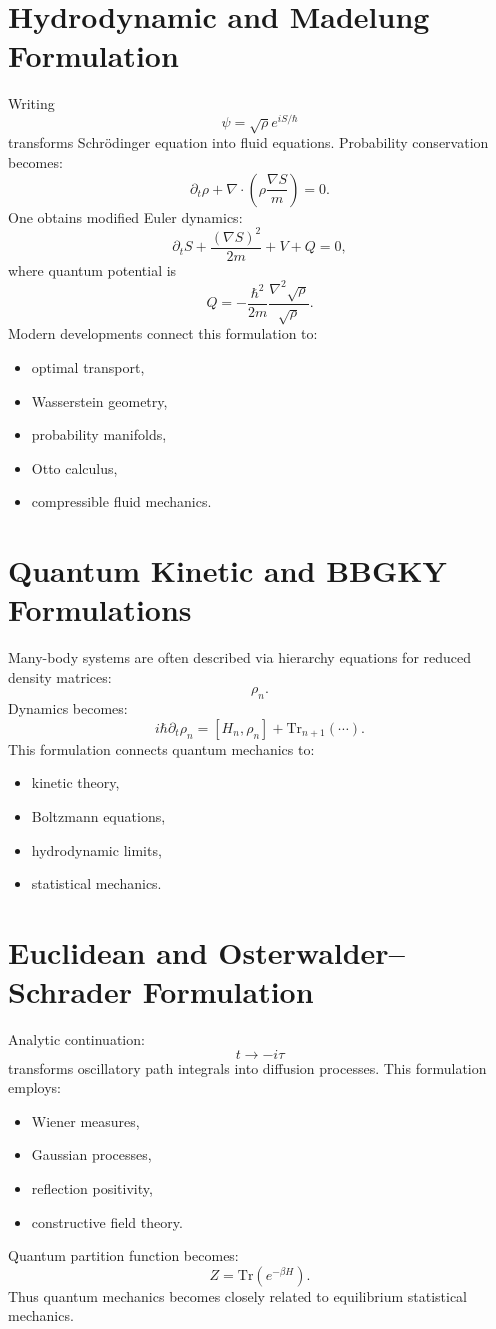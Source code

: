 \section{Hydrodynamic and Madelung Formulation}
\label{qmf:mad}
Writing
\[\psi=\sqrt{\rho}e^{iS/\hbar}\]
transforms Schr\"odinger equation into fluid equations.
Probability conservation becomes:
\[\partial_t \rho+\nabla\cdot\left(\rho\frac{\nabla S}{m}\right)=0.\]
One obtains modified Euler dynamics:
\[\partial_t S+\frac{(\nabla S)^2}{2m}+V+Q=0,\]
where quantum potential is
\[Q=-\frac{\hbar^2}{2m}\frac{\nabla^2\sqrt{\rho}}{\sqrt{\rho}}.\]
Modern developments connect this formulation to:
\begin{itemize}
\item optimal transport,
\item Wasserstein geometry,
\item probability manifolds,
\item Otto calculus,
\item compressible fluid mechanics.
\end{itemize}

\section{Quantum Kinetic and BBGKY Formulations}
\label{qmf:qk}
Many-body systems are often described via hierarchy equations for reduced density matrices:
\[\rho_n.\]
Dynamics becomes:
\[i\hbar\partial_t \rho_n=[H_n,\rho_n]+\mathrm{Tr}_{n+1}(\cdots).\]
This formulation connects quantum mechanics to:
\begin{itemize}
\item kinetic theory,
\item Boltzmann equations,
\item hydrodynamic limits,
\item statistical mechanics.
\end{itemize}
\section{Euclidean and Osterwalder--Schrader Formulation}
\label{qmf:euc}
Analytic continuation:
\[t\rightarrow -i\tau\]
transforms oscillatory path integrals into diffusion processes.
This formulation employs:
\begin{itemize}
\item Wiener measures,
\item Gaussian processes,
\item reflection positivity,
\item constructive field theory.
\end{itemize}
Quantum partition function becomes:
\[Z=\mathrm{Tr}(e^{-\beta H}).\]
Thus quantum mechanics becomes closely related to equilibrium statistical mechanics.
